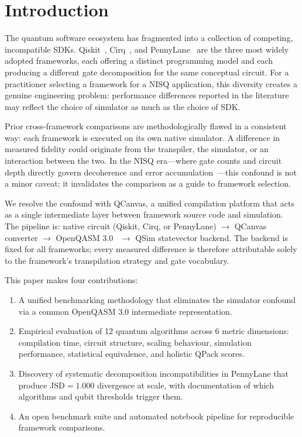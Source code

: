 \section{Introduction}

The quantum software ecosystem has fragmented into a collection of
competing, incompatible SDKs.
Qiskit~\cite{qiskit}, Cirq~\cite{cirq}, and
PennyLane~\cite{bergholm2018pennylane} are the three most widely adopted
frameworks, each offering a distinct programming model and each producing
a different gate decomposition for the same conceptual circuit.
For a practitioner selecting a framework for a NISQ application, this
diversity creates a genuine engineering problem: performance differences
reported in the literature may reflect the choice of simulator as much
as the choice of SDK.

Prior cross-framework comparisons are methodologically flawed in a
consistent way: each framework is executed on its own native simulator.
A difference in measured fidelity could originate from the transpiler,
the simulator, or an interaction between the two.
In the NISQ era---where gate counts and circuit depth directly govern
decoherence and error accumulation~\cite{preskill2018quantum}---this
confound is not a minor caveat; it invalidates the comparison as a guide
to framework selection.

We resolve the confound with QCanvas, a unified compilation platform
that acts as a single intermediate layer between framework source code
and simulation.
The pipeline is: native circuit (Qiskit, Cirq, or PennyLane)
$\to$ QCanvas converter $\to$
OpenQASM 3.0~\cite{cross2022openqasm3}
$\to$ QSim statevector backend.
The backend is fixed for all frameworks; every measured difference is
therefore attributable solely to the framework's transpilation strategy
and gate vocabulary.

This paper makes four contributions:
\begin{enumerate}
  \item A unified benchmarking methodology that eliminates the simulator
        confound via a common OpenQASM 3.0 intermediate representation.
  \item Empirical evaluation of 12 quantum algorithms across 6 metric
        dimensions: compilation time, circuit structure, scaling
        behaviour, simulation performance, statistical equivalence, and
        holistic QPack scores.
  \item Discovery of systematic decomposition incompatibilities in
        PennyLane that produce JSD$=1.000$ divergence at scale, with
        documentation of which algorithms and qubit thresholds trigger
        them.
  \item An open benchmark suite and automated notebook pipeline for
        reproducible framework comparisons.
\end{enumerate}

